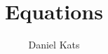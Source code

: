 \documentclass[reprint,a4paper,floatfix,superscriptaddress]{revtex4-1}
\begin{document}
\author{Daniel Kats}

\title{Equations}

\maketitle
\begin{widetext}




\bigskip
\end{widetext}

\end{document}

